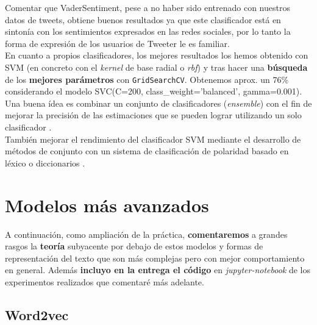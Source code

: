 \documentclass[a4paper,12pt]{report}
\begin{document}
Comentar que VaderSentiment, pese a no haber sido entrenado con nuestros datos de tweets, obtiene buenos resultados ya que este clasificador está en sintonía con los sentimientos expresados en las redes sociales, por lo tanto la forma de expresión de los usuarios de Tweeter le es familiar.
\vspace{2mm}\\
En cuanto a propios clasificadores, los mejores resultados los hemos obtenido con SVM (en concreto con el \textit{kernel} de base radial o \textit{rbf}) y tras hacer una \textbf{búsqueda} de los \textbf{mejores parámetros} con \texttt{GridSearchCV}. Obtenemos aprox. un 76\% considerando el modelo SVC(C=200, class\_weight='balanced', gamma=0.001).
\vspace{2mm}\\
Una buena ídea es combinar un conjunto de clasificadores (\textit{ensemble}) con el fin de mejorar la precisión de las estimaciones que se pueden lograr utilizando un solo clasificador \cite{Rokach}. \\También mejorar el rendimiento del clasificador SVM mediante el desarrollo de métodos de conjunto con un sistema de clasificación de polaridad basado en léxico o diccionarios \cite{Kennedy}. 


\clearpage

\section{Modelos más avanzados}

A continuación, como ampliación de la práctica, \textbf{comentaremos} a grandes rasgos la \textbf{teoría} subyacente por debajo de estos modelos y formas de representación del texto que son más complejas pero con mejor comportamiento en general. Además \textbf{incluyo en la entrega el código} en \textit{jupyter-notebook} de los experimentos realizados que comentaré más adelante.


\subsection{Word2vec}
\end{document}
